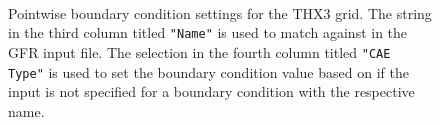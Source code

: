 \begin{figure}[p]
  \setlength{\imagewidth}{1.0\textwidth}
  \setlength{\imageheight}{0.4\textheight}
  \centering
  \\
  \caption[Pointwise boundary condition settings for the THX3 grid.]%
          {Pointwise boundary condition settings for the THX3 grid.
           The string in the third column titled \texttt{"Name"} is used to
           match against  in the GFR input file.
           The selection in the fourth column titled \texttt{"CAE Type"} is
           used to set the boundary condition value based on
            if the input 
           is not specified for a boundary condition with the respective name.}
  \label{FIG:Files:PW:THX3}
\end{figure}


